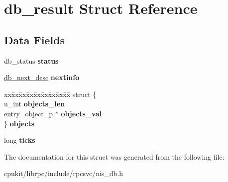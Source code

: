 \hypertarget{structdb__result}{}\section{db\+\_\+result Struct Reference}
\label{structdb__result}
\subsection*{Data Fields}
\begin{DoxyCompactItemize}
\item 
\mbox{\label{structdb__result_a8a8e10dd174ea37ba7d19ec976aa0d64}} 
db\+\_\+status {\bfseries status}
\item 
\mbox{\label{structdb__result_a1b759976d607d02f40d1326b006fecb7}} 
\mbox{\hyperlink{structdb__next__desc}{db\+\_\+next\+\_\+desc}} {\bfseries nextinfo}
\item 
\mbox{\label{structdb__result_ab7703837c98e6d6baf109ca889fc7ca1}} 
\begin{tabbing}
xx\=xx\=xx\=xx\=xx\=xx\=xx\=xx\=xx\=\kill
struct \{\\
\>u\_int {\bfseries objects\_len}\\
\>entry\_object\_p $\ast$ {\bfseries objects\_val}\\
\} {\bfseries objects}\\

\end{tabbing}\item 
\mbox{\label{structdb__result_afe6e112136c2346062ddd2820d9d8158}} 
long {\bfseries ticks}
\end{DoxyCompactItemize}


The documentation for this struct was generated from the following file\+:\begin{DoxyCompactItemize}
\item 
cpukit/librpc/include/rpcsvc/nis\+\_\+db.\+h\end{DoxyCompactItemize}
